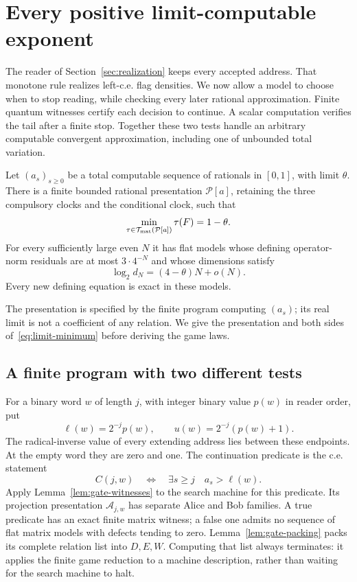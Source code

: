 \section{Every positive limit-computable exponent}\label{sec:classification}
The reader of Section~\ref{sec:realization} keeps every accepted address. That monotone rule realizes left-c.e. flag densities. We now allow a model to choose when to stop reading, while checking every later rational approximation. Finite quantum witnesses certify each decision to continue. A scalar computation verifies the tail after a finite stop. Together these two tests handle an arbitrary computable convergent approximation, including one of unbounded total variation.

\begin{theorem}\label{thm:limit-flag}
Let $(a_s)_{s\ge0}$ be a total computable sequence of rationals in $[0,1]$, with limit $\theta$. There is a finite bounded rational presentation $\mathcal P[a]$, retaining the three compulsory clocks and the conditional clock, such that
\begin{equation}\label{eq:limit-minimum}
 \min_{\tau\in\mathcal T_{\rm mat}(\mathcal P[a])}\tau(F)=1-\theta.
\end{equation}
For every sufficiently large even $N$ it has flat models whose defining operator-norm residuals are at most $3\cdot4^{-N}$ and whose dimensions satisfy
\begin{equation}\label{eq:limit-upper-dimension}
 \log_2d_N=(4-\theta)N+o(N).
\end{equation}
Every new defining equation is exact in these models.
\end{theorem}
The presentation is specified by the finite program computing $(a_s)$; its real limit is not a coefficient of any relation. We give the presentation and both sides of~\eqref{eq:limit-minimum} before deriving the game laws.

\subsection{A finite program with two different tests}\label{sec:stop-program}
For a binary word $w$ of length $j$, with integer binary value $p(w)$ in reader order, put
\[
 \ell(w)=2^{-j}p(w),\qquad u(w)=2^{-j}(p(w)+1).
\]
The radical-inverse value of every extending address lies between these endpoints. At the empty word they are zero and one. The continuation predicate is the c.e. statement
\begin{equation}\label{eq:continue-predicate}
 C(j,w)\quad\Longleftrightarrow\quad
 \exists s\ge j\quad a_s>\ell(w).
\end{equation}
Apply Lemma~\ref{lem:gate-witnesses} to the search machine for this predicate. Its projection presentation $\mathcal A_{j,w}$ has separate Alice and Bob families. A true predicate has an exact finite matrix witness; a false one admits no sequence of flat matrix models with defects tending to zero. Lemma~\ref{lem:gate-packing} packs its complete relation list into $D,E,W$. Computing that list always terminates: it applies the finite game reduction to a machine description, rather than waiting for the search machine to halt.

